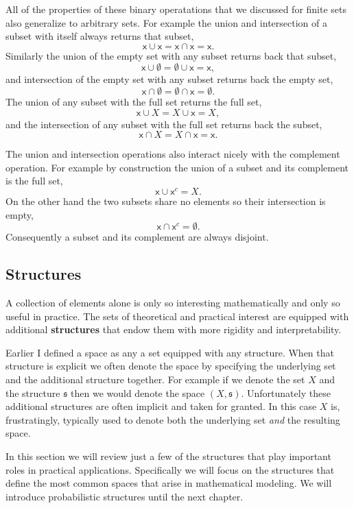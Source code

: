 \documentclass[
  letterpaper,
  DIV=11,
  numbers=noendperiod]{scrartcl}
\begin{document}
All of the properties of these binary operatations that we discussed for
finite sets also generalize to arbitrary sets. For example the union and
intersection of a subset with itself always returns that subset, \[
\mathsf{x} \cup \mathsf{x} = \mathsf{x} \cap \mathsf{x} = \mathsf{x}.
\] Similarly the union of the empty set with any subset returns back
that subset, \[
\mathsf{x} \cup \emptyset = \emptyset \cup \mathsf{x} = \mathsf{x},
\] and intersection of the empty set with any subset returns back the
empty set, \[
\mathsf{x} \cap \emptyset = \emptyset \cap \mathsf{x} = \emptyset.
\] The union of any subset with the full set returns the full set, \[
\mathsf{x} \cup X = X \cup \mathsf{x} = X,
\] and the intersection of any subset with the full set returns back the
subset, \[
\mathsf{x} \cap X = X \cap \mathsf{x} = \mathsf{x}.
\]

The union and intersection operations also interact nicely with the
complement operation. For example by construction the union of a subset
and its complement is the full set, \[
\mathsf{x} \cup \mathsf{x}^{c} = X.
\] On the other hand the two subsets share no elements so their
intersection is empty, \[
\mathsf{x} \cap \mathsf{x}^{c} = \emptyset.
\] Consequently a subset and its complement are always disjoint.

\hypertarget{sec:structures}{%
\subsection{Structures}\label{sec:structures}}

A collection of elements alone is only so interesting mathematically and
only so useful in practice. The sets of theoretical and practical
interest are equipped with additional \textbf{structures} that endow
them with more rigidity and interpretability.

Earlier I defined a space as any a set equipped with any structure. When
that structure is explicit we often denote the space by specifying the
underlying set and the additional structure together. For example if we
denote the set \(X\) and the structure \(\mathfrak{s}\) then we would
denote the space \((X, \mathfrak{s})\). Unfortunately these additional
structures are often implicit and taken for granted. In this case \(X\)
is, frustratingly, typically used to denote both the underlying set
\emph{and} the resulting space.

In this section we will review just a few of the structures that play
important roles in practical applications. Specifically we will focus on
the structures that define the most common spaces that arise in
mathematical modeling. We will introduce probabilistic structures until
the next chapter.
\end{document}
